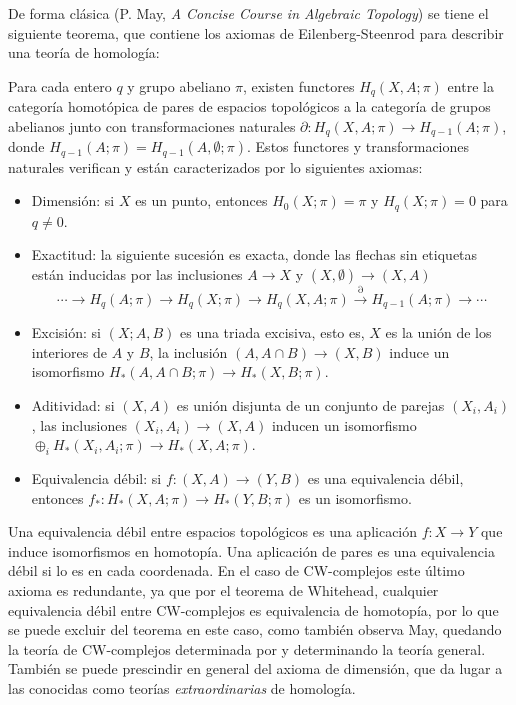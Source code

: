 \documentclass[TA.tex]{subfiles}
\begin{document}
De forma clásica (P. May, \emph{A Concise Course in Algebraic Topology}) se tiene el siguiente teorema, que contiene los axiomas de Eilenberg-Steenrod para describir una teoría de homología:
\begin{teorema}
Para cada entero $q$ y grupo abeliano $\pi$, existen functores $H_q(X,A;\pi)$ entre la categoría homotópica de pares de espacios topológicos a la categoría de grupos abelianos junto con transformaciones naturales $\partial:H_q(X,A;\pi)\to H_{q-1}(A;\pi)$, donde $H_{q-1}(A;\pi)=H_{q-1}(A,\emptyset;\pi)$. Estos functores y transformaciones naturales verifican y están caracterizados por lo siguientes axiomas:
\begin{itemize}
\item Dimensión: si $X$ es un punto, entonces $H_0(X;\pi)=\pi$ y $H_q(X;\pi)=0$ para $q\neq 0$. 
\item Exactitud: la siguiente sucesión es exacta, donde las flechas sin etiquetas están inducidas por las inclusiones $A\to X$ y $(X,\emptyset)\to(X,A)$
\[
\cdots\to H_q(A;\pi)\to H_q(X;\pi)\to H_q(X,A;\pi)\xrightarrow{\partial}H_{q-1}(A;\pi)\to\cdots
\]
\item Excisión: si $(X;A,B)$ es una triada excisiva, esto es, $X$ es la unión de los interiores de $A$ y $B$, la inclusión $(A,A\cap B)\to (X,B)$ induce un isomorfismo $H_*(A,A\cap B;\pi)\to H_*(X,B;\pi)$.
\item Aditividad: si $(X,A)$ es unión disjunta de un conjunto de parejas $(X_i,A_i)$, las inclusiones $(X_i,A_i)\to (X,A)$ inducen un isomorfismo
$\oplus_iH_*(X_i,A_i;\pi)\to H_*(X,A;\pi)$.
\item Equivalencia débil: si $f:(X,A)\to (Y,B)$ es una equivalencia débil, entonces $f_*:H_*(X,A;\pi)\to H_*(Y,B;\pi)$ es un isomorfismo.
\end{itemize}
 
\end{teorema}

Una equivalencia débil entre espacios topológicos es una aplicación $f:X\to Y$ que induce isomorfismos en homotopía. Una aplicación de pares es una equivalencia débil si lo es en cada coordenada. En el caso de CW-complejos este último axioma es redundante, ya que por el teorema de Whitehead, cualquier equivalencia débil entre CW-complejos es equivalencia de homotopía, por lo que se puede excluir del teorema en este caso, como también observa May, quedando la teoría de CW-complejos determinada por y determinando la teoría general. También se puede prescindir en general del axioma de dimensión, que da lugar a las conocidas como teorías \emph{extraordinarias} de homología. 
\end{document}
